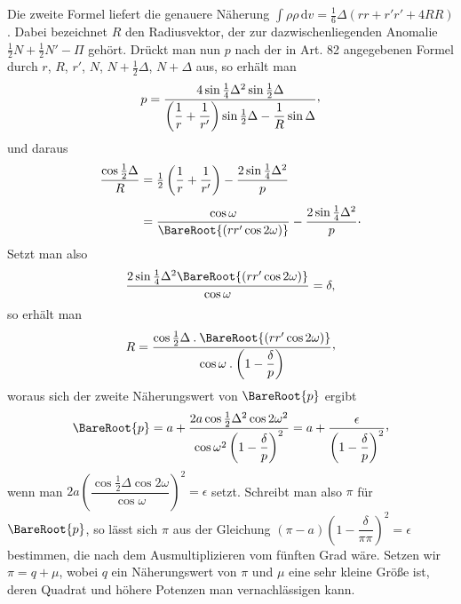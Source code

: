 Die zweite Formel liefert die genauere Näherung $\int\rho\rho\,\mathrm{d}v=\tfrac16\Delta(rr+r'r'+4RR)$. Dabei bezeichnet $R$ den Radiusvektor, der zur dazwischenliegenden Anomalie $\tfrac12N+\tfrac12N'-\Pi$ gehört. Drückt man nun $p$ nach der in Art. 82 angegebenen Formel durch $r$, $R$, $r'$, $N$, $N+\tfrac12\Delta$, $N+\Delta$ aus, so erhält man
\[
p=\frac{4\sin\tfrac14\Delta^2\sin\tfrac12\Delta}{\left(\dfrac1r+\dfrac1{r'}\right)\sin\tfrac12\Delta-\dfrac1R\sin\Delta}\mathpunct{\raisebox{.45ex}{,}}
\]
und daraus
\[
\begin{aligned}
\frac{\cos\tfrac12\Delta}{R}&=\tfrac12\left(\frac1r+\frac1{r'}\right)-\frac{2\sin\tfrac14\Delta^2}{p}\\[4pt]
&=\frac{\cos\omega}{\BareRoot{(rr'\cos2\omega)}}-\frac{2\sin\tfrac14\Delta^2}{p}\mathpunct{\cdot}
\end{aligned}
\]
Setzt man also
\[
\frac{2\sin\tfrac14\Delta^2\BareRoot{(rr'\cos2\omega)}}{\cos\omega}=\delta,
\]
so erhält man
\[
R=\frac{\cos\tfrac12\Delta\mathbin{.}\BareRoot{(rr'\cos2\omega)}}{\cos\omega\mathbin{.}\left(1-\dfrac{\delta}{p}\right)}\mathpunct{\raisebox{.45ex}{,}}
\]
woraus sich der zweite Näherungswert von $\BareRoot{p}$ ergibt
\[
\BareRoot{p}=a+\frac{2a\cos\tfrac12\Delta^2\cos2\omega^2}{\cos\omega^2\left(1-\dfrac{\delta}{p}\right)^2}=a+\frac{\epsilon}{\left(1-\dfrac{\delta}{p}\right)^2}\mathpunct{\raisebox{.45ex}{,}}
\]
wenn man $2a\left(\dfrac{\cos\tfrac12\Delta\cos2\omega}{\cos\omega}\right)^2=\epsilon$ setzt. Schreibt man also $\pi$ für $\BareRoot{p}$, so lässt sich $\pi$ aus der Gleichung $(\pi-a)\left(1-\dfrac{\delta}{\pi\pi}\right)^2=\epsilon$ bestimmen, die nach dem Ausmultiplizieren vom fünften Grad wäre. Setzen wir $\pi=q+\mu$, wobei $q$ ein Näherungswert von $\pi$ und $\mu$ eine sehr kleine Größe ist, deren Quadrat und höhere Potenzen man vernachlässigen kann.

